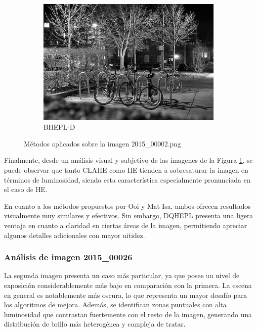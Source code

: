 \documentclass[sigchi]{acmart}
\begin{document}
\begin{figure}[htbp]
	\begin{subfigure}[b]{0.32\textwidth}
		\centering
		\includegraphics[width=\linewidth]{./procesadas/2015_00002/2015_00002_bhepl_d.png}
		\caption{BHEPL-D}
	\end{subfigure}

	\caption{Métodos aplicados sobre la imagen 2015\_00002.png}
	\label{fig:visual_002}
\end{figure}

Finalmente, desde un análisis visual y subjetivo de las imagenes de la Figura
\ref{fig:visual_002}, se puede observar que tanto CLAHE como HE tienden a sobresaturar la
imagen en términos de luminosidad, siendo esta característica especialmente pronunciada en el
caso de HE.

En cuanto a los métodos propuestos por Ooi y Mat Isa, ambos ofrecen resultados visualmente muy
similares y efectivos. Sin embargo, DQHEPL presenta una ligera ventaja en cuanto a claridad en
ciertas áreas de la imagen, permitiendo apreciar algunos detalles adicionales con mayor
nitidez.

\subsubsection{Análisis de imagen 2015\_00026}

La segunda imagen presenta un caso más particular, ya que posee un nivel de exposición
considerablemente más bajo en comparación con la primera. La escena en general es notablemente
más oscura, lo que representa un mayor desafío para los algoritmos de mejora. Además, se
identifican zonas puntuales con alta luminosidad que contrastan fuertemente con el resto de la
imagen, generando una distribución de brillo más heterogénea y compleja de tratar.
\end{document}

